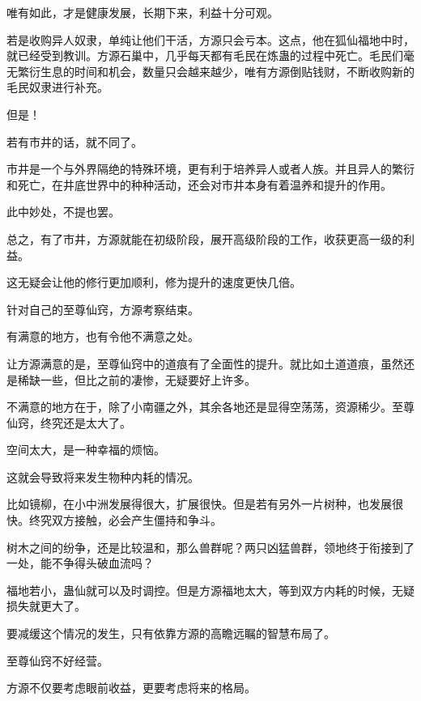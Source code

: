 \begin{this_body}
唯有如此，才是健康发展，长期下来，利益十分可观。

若是收购异人奴隶，单纯让他们干活，方源只会亏本。这点，他在狐仙福地中时，就已经受到教训。方源石巢中，几乎每天都有毛民在炼蛊的过程中死亡。毛民们毫无繁衍生息的时间和机会，数量只会越来越少，唯有方源倒贴钱财，不断收购新的毛民奴隶进行补充。

但是！

若有市井的话，就不同了。

市井是一个与外界隔绝的特殊环境，更有利于培养异人或者人族。并且异人的繁衍和死亡，在井底世界中的种种活动，还会对市井本身有着温养和提升的作用。

此中妙处，不提也罢。

总之，有了市井，方源就能在初级阶段，展开高级阶段的工作，收获更高一级的利益。

这无疑会让他的修行更加顺利，修为提升的速度更快几倍。

针对自己的至尊仙窍，方源考察结束。

有满意的地方，也有令他不满意之处。

让方源满意的是，至尊仙窍中的道痕有了全面性的提升。就比如土道道痕，虽然还是稀缺一些，但比之前的凄惨，无疑要好上许多。

不满意的地方在于，除了小南疆之外，其余各地还是显得空荡荡，资源稀少。至尊仙窍，终究还是太大了。

空间太大，是一种幸福的烦恼。

这就会导致将来发生物种内耗的情况。

比如镜柳，在小中洲发展得很大，扩展很快。但是若有另外一片树种，也发展很快。终究双方接触，必会产生僵持和争斗。

树木之间的纷争，还是比较温和，那么兽群呢？两只凶猛兽群，领地终于衔接到了一处，能不争得头破血流吗？

福地若小，蛊仙就可以及时调控。但是方源福地太大，等到双方内耗的时候，无疑损失就更大了。

要减缓这个情况的发生，只有依靠方源的高瞻远瞩的智慧布局了。

至尊仙窍不好经营。

方源不仅要考虑眼前收益，更要考虑将来的格局。

\end{this_body}

